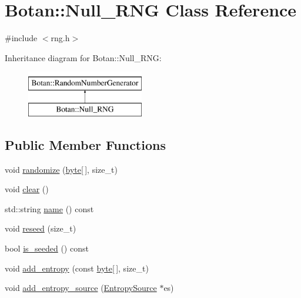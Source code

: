 \hypertarget{classBotan_1_1Null__RNG}{\section{Botan\-:\-:Null\-\_\-\-R\-N\-G Class Reference}
\label{classBotan_1_1Null__RNG}
}


{\ttfamily \#include $<$rng.\-h$>$}

Inheritance diagram for Botan\-:\-:Null\-\_\-\-R\-N\-G\-:\begin{figure}[H]
\begin{center}
\leavevmode
\includegraphics[height=2.000000cm]{classBotan_1_1Null__RNG}
\end{center}
\end{figure}
\subsection*{Public Member Functions}
\begin{DoxyCompactItemize}
\item 
void \hyperlink{classBotan_1_1Null__RNG_ab0c0c09bf2b10236134801fc038540f0}{randomize} (\hyperlink{namespaceBotan_a7d793989d801281df48c6b19616b8b84}{byte}\mbox{[}$\,$\mbox{]}, size\-\_\-t)
\item 
void \hyperlink{classBotan_1_1Null__RNG_a6597b0069a1976015f90682fcfcd8adf}{clear} ()
\item 
std\-::string \hyperlink{classBotan_1_1Null__RNG_ad38e40a2c2ced3a66267ac4743f840c2}{name} () const 
\item 
void \hyperlink{classBotan_1_1Null__RNG_a1381ed231b76b4c90749757744b9366d}{reseed} (size\-\_\-t)
\item 
bool \hyperlink{classBotan_1_1Null__RNG_a863200004d583f228335fd7735ede589}{is\-\_\-seeded} () const 
\item 
void \hyperlink{classBotan_1_1Null__RNG_a434b7ffdc48bc1cf5c1d220ff1f14ae0}{add\-\_\-entropy} (const \hyperlink{namespaceBotan_a7d793989d801281df48c6b19616b8b84}{byte}\mbox{[}$\,$\mbox{]}, size\-\_\-t)
\item 
void \hyperlink{classBotan_1_1Null__RNG_a4cb61d90224165dc6cf1d204a8d35be8}{add\-\_\-entropy\-\_\-source} (\hyperlink{classBotan_1_1EntropySource}{Entropy\-Source} $\ast$es)
\end{DoxyCompactItemize}
